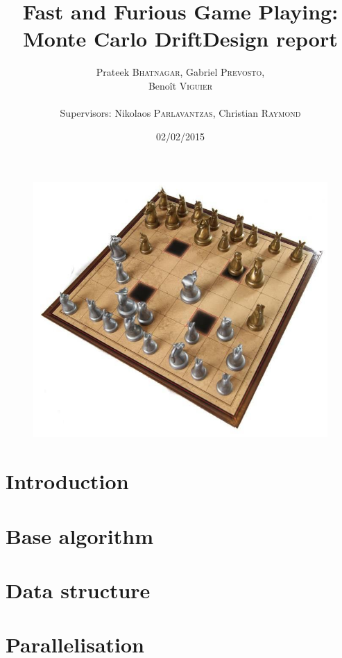 \documentclass[12pt]{article}
\title{Fast and Furious Game Playing: Monte Carlo Drift\smallbreak Design report} %
\author{Prateek \textsc{Bhatnagar}, Gabriel \textsc{Prevosto}, \\
        Benoît \textsc{Viguier} \\
        \\
        Supervisors: Nikolaos \textsc{Parlavantzas}, Christian \textsc{Raymond}}
\date{02/02/2015}
\begin{document}
\maketitle

\begin{figure}[!h] 
\centerline{\includegraphics[scale=0.50]{Pictures/arimaa}}
\end{figure}
\newpage

\tableofcontents
\newpage


\section{Introduction}				\label{sec:introduction} 		

\newpage
\section{Base algorithm}			\label{sec:Algo}			

\newpage
\section{Data structure}			\label{sec:DS}				

\newpage
\section{Parallelisation}			\label{sec:parallelization}
\end{document}
